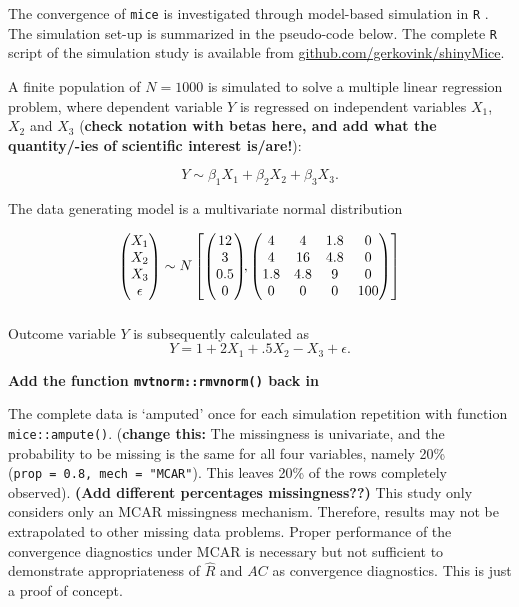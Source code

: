 \documentclass[Royal,times,sageh]{sagej}
\begin{document}
The convergence of \texttt{mice} is investigated through model-based
simulation in \texttt{R} \citep[version 3.6.3;][]{R}. The simulation
set-up is summarized in the pseudo-code below. The complete \texttt{R}
script of the simulation study is available from
\href{https://github.com/gerkovink/shinyMice/tree/master/3.Thesis/1.SimulationStudy}{github.com/gerkovink/shinyMice}.

A finite population of \(N=1000\) is simulated to solve a multiple
linear regression problem, where dependent variable \(Y\) is regressed
on independent variables \(X_1\), \(X_2\) and \(X_3\) (\textbf{check
notation with betas here, and add what the quantity/-ies of scientific
interest is/are!}):

\[Y \sim \beta_1 X_1 + \beta_2 X_2 + \beta_3 X_3.\]

The data generating model is a multivariate normal distribution

\begin{align*}
\begin{pmatrix}X_1\\
X_2\\
X_3\\
\epsilon
\end{pmatrix} \sim  N
\begin{bmatrix}
\begin{pmatrix}
12\\
3\\
0.5\\
0
\end{pmatrix}\!\!,
\begin{pmatrix}
4 & 4 & 1.8 & 0\\
4 & 16 & 4.8 & 0\\
1.8 & 4.8 & 9 & 0\\
0 & 0 & 0 & 100
\end{pmatrix}
\end{bmatrix}\\[2\jot]
\end{align*}

Outcome variable \(Y\) is subsequently calculated as
\[Y =  1 + 2X_1 + .5X_2 - X_3 + \epsilon .\]

\textbf{Add the function \texttt{mvtnorm::rmvnorm()} back in}

The complete data is `amputed' once for each simulation repetition with
function \texttt{mice::ampute()}. (\textbf{change this:} The missingness
is univariate, and the probability to be missing is the same for all
four variables, namely 20\% (\texttt{prop\ =\ 0.8,\ mech\ =\ "MCAR"}).
This leaves 20\% of the rows completely observed). \textbf{(Add
different percentages missingness??)} This study only considers only an
MCAR missingness mechanism. Therefore, results may not be extrapolated
to other missing data problems. Proper performance of the convergence
diagnostics under MCAR is necessary but not sufficient to demonstrate
appropriateness of \(\widehat{R}\) and \(AC\) as convergence
diagnostics. This is just a proof of concept.
\end{document}

